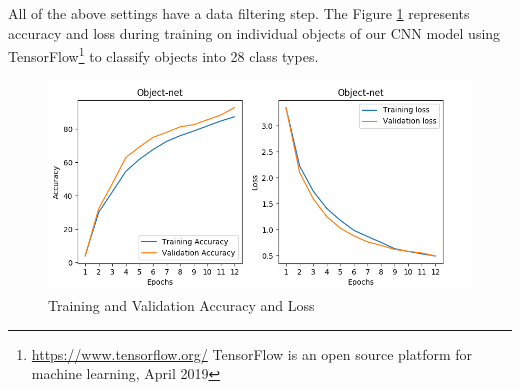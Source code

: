 All of the above settings have a data filtering step. The Figure \ref{fig:accloss} represents accuracy and loss during training on individual objects of our CNN model
using TensorFlow\footnote{\url{https://www.tensorflow.org/} TensorFlow is an open source platform
for machine learning, April 2019} to classify objects into 28 class types.




\begin{figure}[htp]
\begin{center}
        \includegraphics[scale=0.42]{images/accuracy-loss.png}
        \caption{Training and Validation Accuracy and Loss}
        \label{fig:accloss}
\end{center}
\end{figure}







